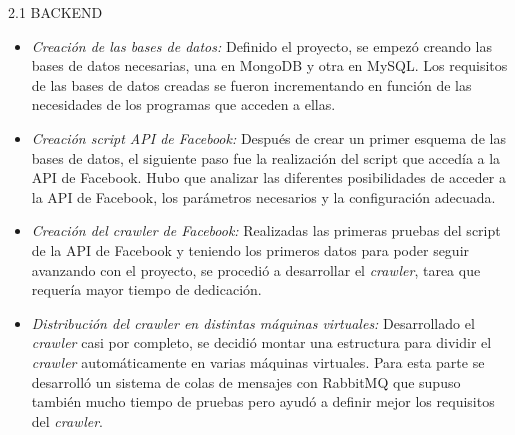 \begin{itemize}
  2.1 BACKEND    
  \begin{itemize}
    \item \textit{Creación de las bases de datos:} Definido el proyecto, se empezó creando las bases de datos necesarias, una en MongoDB y otra en MySQL. Los requisitos de las bases de datos creadas se fueron incrementando en función de las necesidades de los programas que acceden a ellas.
    \item \textit{Creación script API de Facebook: } Después de crear un primer esquema de las bases de datos, el siguiente paso fue la realización del script que accedía a la API de Facebook. Hubo que analizar las diferentes posibilidades de acceder a la API de Facebook, los parámetros necesarios y la configuración adecuada.
    \item \textit{Creación del \textit{crawler} de Facebook: } Realizadas las primeras pruebas del script de la API de Facebook y teniendo los primeros datos para poder seguir avanzando con el proyecto, se procedió a desarrollar el \textit{crawler}, tarea que requería mayor tiempo de dedicación.
    \item \textit{Distribución del \textit{crawler} en distintas máquinas virtuales: }Desarrollado el \textit{crawler} casi por completo, se decidió montar una estructura para dividir el \textit{crawler} automáticamente en varias máquinas virtuales. Para esta parte se desarrolló un sistema de colas de mensajes con RabbitMQ que supuso también mucho tiempo de pruebas pero ayudó a definir mejor los requisitos del \textit{crawler}.
    \end{itemize}
    

\end{itemize}
